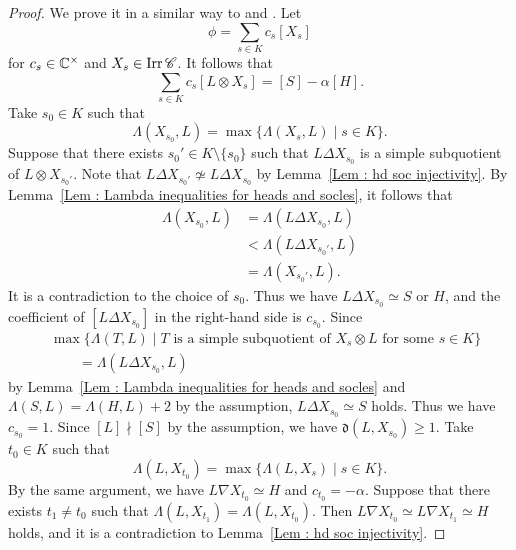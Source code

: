 \begin{proof}
We prove it in a similar way to
\cite[Theorem 4.1]{KK19} and \cite[Theorem 4.13]{KKOP20}.
Let
\[
\phi = \sum_{s \in K} c_s[X_s]
\]
for $c_s \in \mathbb{C}^{\times}$ and $X_s \in \mathop{\mathrm{Irr}}\nolimits\mathscr{C}$.
It follows that
\[
\sum_{s \in K} c_s[L \otimes X_s] = [S] - \alpha[H].
\]
Take $s_0 \in K$ such that
\[
\Lambda(X_{s_0}, L)
= \max\{\Lambda(X_s, L) \mid s \in K\}.
\]
Suppose that there exists $s_0' \in K \setminus\{s_0\}$
such that $L \Delta X_{s_0}$ is a simple subquotient of
$L \otimes X_{s_0'}$.
Note that $L \Delta X_{s_0'} \not\simeq L \Delta X_{s_0}$
by Lemma~\ref{Lem : hd soc injectivity}.
By Lemma~\ref{Lem : Lambda inequalities for heads and socles},
it follows that
\[
\begin{aligned}
\Lambda(X_{s_0}, L)
&= \Lambda(L \Delta X_{s_0}, L) \\
&< \Lambda(L \Delta X_{s_0'}, L) \\
&= \Lambda(X_{s_0'}, L).
\end{aligned}
\]
It is a contradiction to the choice of $s_0$.
Thus we have $L \Delta X_{s_0} \simeq S$ or $H$,
and the coefficient of $[L \Delta X_{s_0}]$
in the right-hand side is $c_{s_0}$.
Since
\[
\begin{aligned}
&\max\{\Lambda(T, L) \mid
T \text{ is a simple subquotient of } X_s \otimes L
\text{ for some } s \in K\} \\
&\qquad = \Lambda(L \Delta X_{s_0}, L)
\end{aligned}
\]
by Lemma~\ref{Lem : Lambda inequalities for heads and socles}
and $\Lambda(S, L) = \Lambda(H, L) + 2$ by the assumption,
$L \Delta X_{s_0} \simeq S$ holds.
Thus we have $c_{s_0} = 1$.
Since $[L] \nmid [S]$ by the assumption,
we have $\mathfrak{d}(L, X_{s_0}) \geq 1$.
Take $t_0 \in K$ such that
\[
\Lambda(L, X_{t_0})
= \max\{\Lambda(L, X_s) \mid s \in K\}.
\]
By the same argument, we have $L \nabla X_{t_0} \simeq H$
and $c_{t_0} = -\alpha$.
Suppose that there exists $t_1 \neq t_0$ such that
$\Lambda(L, X_{t_1}) = \Lambda(L, X_{t_0})$.
Then $L \nabla X_{t_0} \simeq L \nabla X_{t_1} \simeq H$
holds, and it is a contradiction to
Lemma~\ref{Lem : hd soc injectivity}.


\end{proof}
